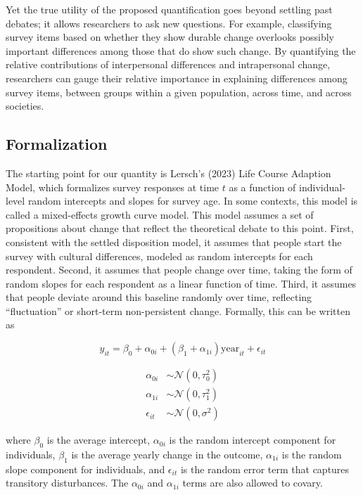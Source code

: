 \documentclass[
  12pt,
]{article}
\begin{document}
Yet the true utility of the proposed quantification goes beyond settling
past debates; it allows researchers to ask new questions. For example,
classifying survey items based on whether they show durable change
overlooks possibly important differences among those that do show such
change. By quantifying the relative contributions of interpersonal
differences and intrapersonal change, researchers can gauge their
relative importance in explaining differences among survey items,
between groups within a given population, across time, and across
societies.

\hypertarget{formalization}{%
\subsection{Formalization}\label{formalization}}

The starting point for our quantity is Lersch's (2023) Life Course
Adaption Model, which formalizes survey responses at time \(t\) as a
function of individual-level random intercepts and slopes for survey
age. In some contexts, this model is called a mixed-effects growth curve
model. This model assumes a set of propositions about change that
reflect the theoretical debate to this point. First, consistent with the
settled disposition model, it assumes that people start the survey with
cultural differences, modeled as random intercepts for each respondent.
Second, it assumes that people change over time, taking the form of
random slopes for each respondent as a linear function of time. Third,
it assumes that people deviate around this baseline randomly over time,
reflecting ``fluctuation'' or short-term non-persistent change.
Formally, this can be written as

\[
y_{it} = \beta_0 + \alpha_{0i} + (\beta_1 + \alpha_{1i}) \text{year}_{it} + \epsilon_{it}
\]

\[
\begin{aligned}
\alpha_{0i} &\sim \mathcal{N}(0,\tau^2_{0}) \\
\alpha_{1i} &\sim \mathcal{N}(0,\tau^2_{1}) \\
\epsilon_{it} &\sim \mathcal{N}(0,\sigma^2)
\end{aligned}
\]

where \(\beta_0\) is the average intercept, \(\alpha_{0i}\) is the
random intercept component for individuals, \(\beta_1\) is the average
yearly change in the outcome, \(\alpha_{1i}\) is the random slope
component for individuals, and \(\epsilon_{it}\) is the random error
term that captures transitory disturbances. The \(\alpha_{0i}\) and
\(\alpha_{1i}\) terms are also allowed to covary.
\end{document}
